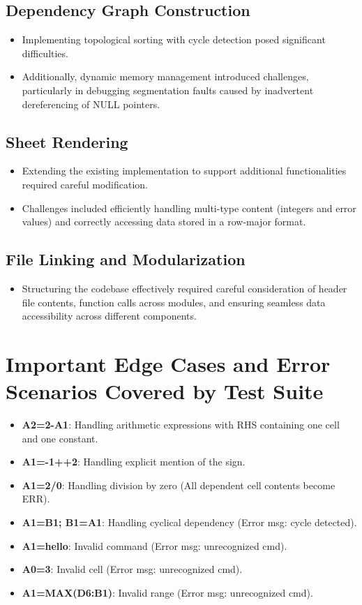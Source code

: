 \documentclass{article}
\begin{document}
\subsection{Dependency Graph Construction}
\begin{itemize}
    \item Implementing topological sorting with cycle detection posed significant difficulties.
    \item Additionally, dynamic memory management introduced challenges, particularly in debugging segmentation faults caused by inadvertent dereferencing of NULL pointers.
\end{itemize}

\subsection{Sheet Rendering}
\begin{itemize}
    \item Extending the existing implementation to support additional functionalities required careful modification.
    \item Challenges included efficiently handling multi-type content (integers and error values) and correctly accessing data stored in a row-major format.
\end{itemize}

\subsection{File Linking and Modularization}
\begin{itemize}
    \item Structuring the codebase effectively required careful consideration of header file contents, function calls across modules, and ensuring seamless data accessibility across different components.
\end{itemize}

\newpage
\section{Important Edge Cases and Error Scenarios Covered by Test Suite}

\begin{itemize}
    \item \textbf{A2=2-A1}: Handling arithmetic expressions with RHS containing one cell and one constant.
    \item \textbf{A1=-1++2}: Handling explicit mention of the sign.
    \item \textbf{A1=2/0}: Handling division by zero (All dependent cell contents become ERR).
    \item \textbf{A1=B1; B1=A1}: Handling cyclical dependency (Error msg: cycle detected).
    \item \textbf{A1=hello}: Invalid command (Error msg: unrecognized cmd).
    \item \textbf{A0=3}: Invalid cell (Error msg: unrecognized cmd).
    \item \textbf{A1=MAX(D6:B1)}: Invalid range (Error msg: unrecognized cmd).
\end{itemize}
\end{document}
